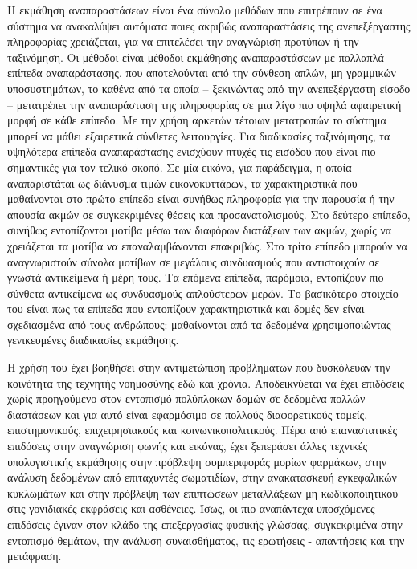 Η εκμάθηση αναπαραστάσεων είναι ένα σύνολο μεθόδων που επιτρέπουν σε ένα σύστημα να ανακαλύψει αυτόματα ποιες ακριβώς αναπαραστάσεις της ανεπεξέργαστης πληροφορίας χρειάζεται, για να επιτελέσει την αναγνώριση προτύπων ή την ταξινόμηση. 
Οι μέθοδοι  είναι μέθοδοι εκμάθησης αναπαραστάσεων με πολλαπλά επίπεδα αναπαράστασης, που αποτελούνται από την σύνθεση απλών, μη γραμμικών υποσυστημάτων, το καθένα από τα οποία -- ξεκινώντας από την ανεπεξέργαστη είσοδο -- μετατρέπει την αναπαράσταση της πληροφορίας σε μια λίγο πιο υψηλά αφαιρετική μορφή σε κάθε επίπεδο.
Με την χρήση αρκετών τέτοιων μετατροπών το σύστημα μπορεί να μάθει εξαιρετικά σύνθετες λειτουργίες.
Για διαδικασίες ταξινόμησης, τα υψηλότερα επίπεδα αναπαράστασης ενισχύουν πτυχές τις εισόδου που είναι πιο σημαντικές για τον τελικό σκοπό.
Σε μία εικόνα, για παράδειγμα, η οποία αναπαριστάται ως διάνυσμα τιμών εικονοκυττάρων, τα χαρακτηριστικά που μαθαίνονται στο πρώτο επίπεδο είναι συνήθως πληροφορία για την παρουσία ή την απουσία ακμών σε συγκεκριμένες θέσεις και προσανατολισμούς.
Στο δεύτερο επίπεδο, συνήθως εντοπίζονται μοτίβα μέσω των διαφόρων διατάξεων των ακμών, χωρίς να χρειάζεται τα μοτίβα να επαναλαμβάνονται επακριβώς.
Στο τρίτο επίπεδο μπορούν να αναγνωριστούν σύνολα μοτίβων σε μεγάλους συνδυασμούς που αντιστοιχούν σε γνωστά αντικείμενα ή μέρη τους.
Τα επόμενα επίπεδα, παρόμοια, εντοπίζουν πιο σύνθετα αντικείμενα ως συνδυασμούς απλούστερων μερών.
Το βασικότερο στοιχείο του  είναι πως τα επίπεδα που εντοπίζουν χαρακτηριστικά και δομές δεν είναι σχεδιασμένα από τους ανθρώπους: μαθαίνονται από τα δεδομένα χρησιμοποιώντας γενικευμένες διαδικασίες εκμάθησης.

Η χρήση του  έχει βοηθήσει στην αντιμετώπιση προβλημάτων που δυσκόλευαν την κοινότητα της τεχνητής νοημοσύνης εδώ και χρόνια. 
Αποδεικνύεται να έχει επιδόσεις χωρίς προηγούμενο στον εντοπισμό πολύπλοκων δομών σε δεδομένα πολλών διαστάσεων και για αυτό είναι εφαρμόσιμο σε πολλούς διαφορετικούς τομείς, επιστημονικούς, επιχειρησιακούς και κοινωνικοπολιτικούς.
Πέρα από επαναστατικές επιδόσεις στην αναγνώριση φωνής και εικόνας, έχει ξεπεράσει άλλες τεχνικές υπολογιστικής εκμάθησης στην πρόβλεψη συμπεριφοράς μορίων φαρμάκων, στην ανάλυση δεδομένων από επιταχυντές σωματιδίων, στην ανακατασκευή εγκεφαλικών κυκλωμάτων και στην πρόβλεψη των επιπτώσεων μεταλλάξεων μη κωδικοποιητικού  στις γονιδιακές εκφράσεις και ασθένειες.
Ίσως, οι πιο αναπάντεχα υποσχόμενες επιδόσεις έγιναν στον κλάδο της επεξεργασίας φυσικής γλώσσας, συγκεκριμένα στην εντοπισμό θεμάτων, την ανάλυση συναισθήματος, τις ερωτήσεις - απαντήσεις και την μετάφραση.


